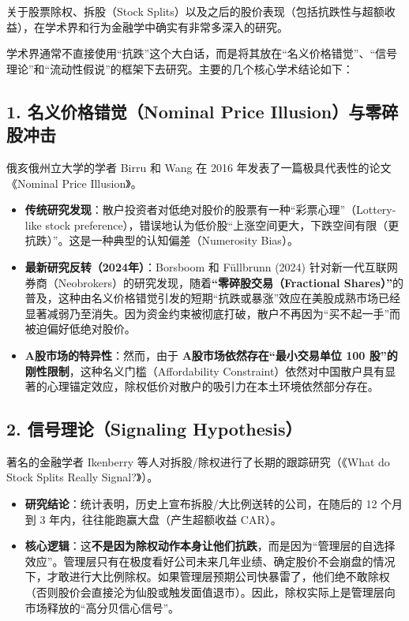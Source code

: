 \documentclass[a4paper,10pt]{article}
\begin{document}
关于股票除权、拆股（Stock Splits）以及之后的股价表现（包括抗跌性与超额收益），在学术界和行为金融学中确实有非常多深入的研究。

学术界通常不直接使用“抗跌”这个大白话，而是将其放在“名义价格错觉”、“信号理论”和“流动性假说”的框架下去研究。主要的几个核心学术结论如下：

\subsection{1. 名义价格错觉（Nominal Price Illusion）与零碎股冲击}

俄亥俄州立大学的学者 Birru 和 Wang 在 2016 年发表了一篇极具代表性的论文《Nominal Price Illusion》\cite{BirruWang2016}。

\begin{itemize}
    \item \textbf{传统研究发现}：散户投资者对低绝对股价的股票有一种“彩票心理”（Lottery-like stock preference），错误地认为低价股“上涨空间更大，下跌空间有限（更抗跌）”。这是一种典型的认知偏差（Numerosity Bias）。
    \item \textbf{最新研究反转（2024年）}：Borsboom 和 Füllbrunn (2024)\cite{BorsboomFullbrunn2024} 针对新一代互联网券商（Neobrokers）的研究发现，随着\textbf{“零碎股交易（Fractional Shares）”}的普及，这种由名义价格错觉引发的短期“抗跌或暴涨”效应在美股成熟市场已经显著减弱乃至消失。因为资金约束被彻底打破，散户不再因为“买不起一手”而被迫偏好低绝对股价。
    \item \textbf{A股市场的特异性}：然而，由于 \textbf{A股市场依然存在“最小交易单位 100 股”的刚性限制}，这种名义门槛（Affordability Constraint）依然对中国散户具有显著的心理锚定效应，除权低价对散户的吸引力在本土环境依然部分存在。
\end{itemize}

\subsection{2. 信号理论（Signaling Hypothesis）}

著名的金融学者 Ikenberry 等人对拆股/除权进行了长期的跟踪研究（《What do Stock Splits Really Signal?》\cite{Ikenberryetal}）。

\begin{itemize}
    \item \textbf{研究结论}：统计表明，历史上宣布拆股/大比例送转的公司，在随后的 12 个月到 3 年内，往往能跑赢大盘（产生超额收益 CAR）。
    \item \textbf{核心逻辑}：这\textbf{不是因为除权动作本身让他们抗跌}，而是因为“管理层的自选择效应”。管理层只有在极度看好公司未来几年业绩、确定股价不会崩盘的情况下，才敢进行大比例除权。如果管理层预期公司快暴雷了，他们绝不敢除权（否则股价会直接沦为仙股或触发面值退市）。因此，除权实际上是管理层向市场释放的“高分贝信心信号”。
\end{itemize}
\end{document}

